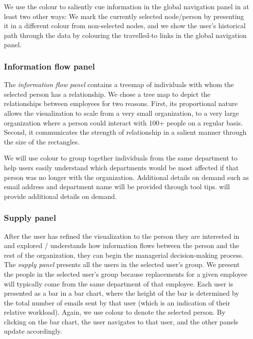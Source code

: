 \documentclass{soups}
\begin{document}
We use the colour to saliently cue\cite{ware2012information} information in the global navigation panel in at least two other ways: We mark the currently selected node/person by presenting it in a different colour from non-selected nodes, and we show the user's historical path through the data by colouring the travelled-to links in the global navigation panel.

\subsubsection{Information flow panel}

The \emph{information flow panel} contains a treemap of individuals with whom the selected person has a relationship. We chose a tree map to depict the relationships between employees for two reasons. First, its proportional nature allows the visualization to scale from a very small organization, to a very large organization where a person could interact with 100+ people on a regular basis. Second, it communicates the strength of relationship in a salient manner through the size of the rectangles.

We will use colour to group together individuals from the same department to help users easily understand which departments would be most affected if that person was no longer with the organization.  Additional details on demand\cite{anafigueiras} such as email address and department name will be provided through tool tips.  will provide additional details on demand. 

\subsubsection{Supply panel}

After the user has refined the visualization to the person they are interested in and explored / understands how information flows between the person and the rest of the organization, they can begin the managerial decision-making process. The \emph{supply panel} presents all the users in the selected user's group. We present the people in the selected user's group because replacements for a given employee will typically come from the same department of that employee. Each user is presented as a bar in a bar chart, where the height of the bar is determined by the total number of emails sent by that user (which is an indication of their relative workload). Again, we use colour to denote the selected person.  By clicking on the bar chart, the user navigates to that user, and the other panels update accordingly.
\end{document}
